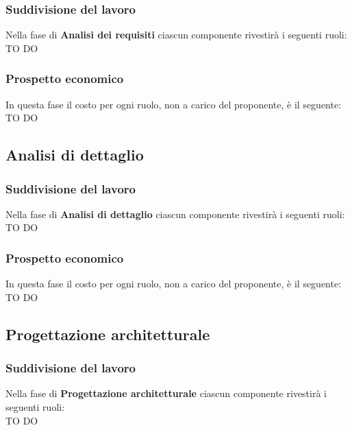 		\subsubsection{Suddivisione del lavoro} %
		\label{ssub:suddivisione_del_lavoro}
		Nella fase di \textbf{Analisi dei requisiti} ciascun componente rivestirà i seguenti ruoli: \\
		TO DO
		
		\subsubsection{Prospetto economico} %
		\label{ssub:prospetto_economico}
		In questa fase il costo per ogni ruolo, non a carico del proponente, è il seguente: \\
		TO DO
		
	
	\subsection{Analisi di dettaglio} %
	\label{sub:analisi_di_dettaglio}
		\subsubsection{Suddivisione del lavoro} %
		\label{ssub:suddivisione_del_lavoro}
		Nella fase di \textbf{Analisi di dettaglio} ciascun componente rivestirà i seguenti ruoli: \\
		TO DO
		
		\subsubsection{Prospetto economico} %
		\label{ssub:prospetto_economico}
		In questa fase il costo per ogni ruolo, non a carico del proponente, è il seguente: \\
		TO DO
		
	
	\subsection{Progettazione architetturale} %
	\label{sub:progettazione_architetturale}
		\subsubsection{Suddivisione del lavoro} %
		\label{ssub:suddivisione_del_lavoro}
		Nella fase di \textbf{Progettazione architetturale} ciascun componente rivestirà i seguenti ruoli: \\
		TO DO
		
